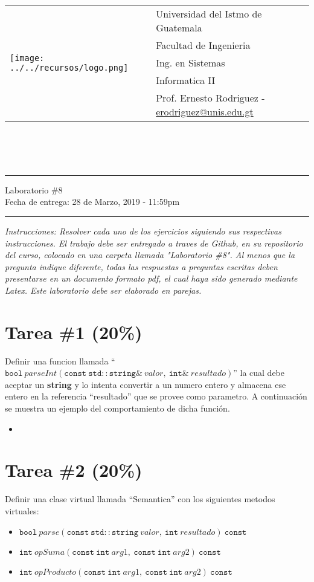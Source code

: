 \documentclass{article}
\newcommand{\horrule}[1]{\rule{\linewidth}{#1}}
\newcommand{\perlscript}[2]{
\begin{itemize}
\item[]
\end{itemize}
}
\begin{document}
\begin{tabular}{l l}
\multirow{5}{*}{\texttt{[image: ../../recursos/logo.png]}} & Universidad del Istmo de Guatemala \\
 & Facultad de Ingenieria \\
 & Ing. en Sistemas \\
 & Informatica II \\
 & Prof. Ernesto Rodriguez - \href{mailto:erodriguez@unis.edu.gt}{erodriguez@unis.edu.gt} \\
\end{tabular}
\\\\\\

\begin{center}
        \horrule{0.5pt}
        \huge{Laboratorio \#8} \\
        \large{Fecha de entrega: 28 de Marzo, 2019 - 11:59pm} \\
        \horrule{1pt}
\end{center}

\emph{Instrucciones: Resolver cada uno de los ejercicios siguiendo sus respectivas
instrucciones. El trabajo debe ser entregado a traves de Github, en su repositorio del curso, colocado en una carpeta llamada "Laboratorio \#8".
Al menos que la pregunta indique diferente, todas las respuestas a preguntas escritas deben presentarse en
un documento formato pdf, el cual haya sido generado mediante Latex. Este laboratorio
debe ser elaborado en parejas.}

\section*{Tarea \#1 (20\%)}

Definir una funcion llamada ``$\mathtt{bool}\ parseInt(\mathtt{const\ std::string\&}\ valor,\ \mathtt{int\&}\ resultado)$'' la
cual debe aceptar un {\bf string} y lo intenta convertir a un numero entero y almacena ese entero en la referencia
``resultado'' que se provee como parametro. A continuaci\'on se muestra un ejemplo del comportamiento
de dicha funci\'on.
\perlscript{parseInt.cc}{Tarea 1}

\section*{Tarea \#2 (20\%)}

Definir una clase virtual llamada ``Semantica'' con los siguientes metodos virtuales:
\begin{itemize}
        \item{$\mathtt{bool}\ parse(\mathtt{const\ std::string}\ valor,\ \mathtt{int}\ resultado)\ \mathtt{const}$}
        \item{$\mathtt{int}\ opSuma(\mathtt{const\ int}\ arg1,\ \mathtt{const\ int}\ arg2)\ \mathtt{const}$}
        \item{$\mathtt{int}\ opProducto(\mathtt{const\ int}\ arg1,\ \mathtt{const\ int}\ arg2)\ \mathtt{const}$}
\end{itemize}
\end{document}

